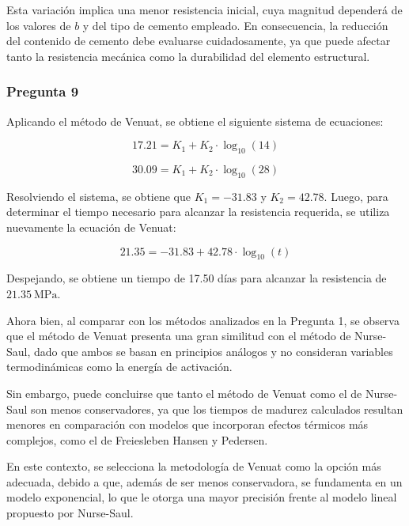 Esta variación implica una menor resistencia inicial, cuya magnitud dependerá de los valores de \(b\) y del tipo de cemento empleado. En consecuencia, la reducción del contenido de cemento debe evaluarse cuidadosamente, ya que puede afectar tanto la resistencia mecánica como la durabilidad del elemento estructural.

\subsubsection*{Pregunta 9} 

Aplicando el método de Venuat, se obtiene el siguiente sistema de ecuaciones:

\begin{equation}
    17.21 = K_1 + K_2 \cdot \log_{10}(14)
\end{equation}

\begin{equation}
    30.09 = K_1 + K_2 \cdot \log_{10}(28)
\end{equation}

Resolviendo el sistema, se obtiene que \( K_1 = -31.83 \) y \( K_2 = 42.78 \).  
Luego, para determinar el tiempo necesario para alcanzar la resistencia requerida, se utiliza nuevamente la ecuación de Venuat:

\begin{equation}
    21.35 = -31.83 + 42.78 \cdot \log_{10}(t)
\end{equation}

Despejando, se obtiene un tiempo de 17.50 días para alcanzar la resistencia de \(21.35~\mathrm{MPa}\).


Ahora bien, al comparar con los métodos analizados en la Pregunta 1, se observa que el método de Venuat presenta una gran similitud con el método de Nurse-Saul, dado que ambos se basan en principios análogos y no consideran variables termodinámicas como la energía de activación.  

Sin embargo, puede concluirse que tanto el método de Venuat como el de Nurse-Saul son menos conservadores, ya que los tiempos de madurez calculados resultan menores en comparación con modelos que incorporan efectos térmicos más complejos, como el de Freiesleben Hansen y Pedersen.

En este contexto, se selecciona la metodología de Venuat como la opción más adecuada, debido a que, además de ser menos conservadora, se fundamenta en un modelo exponencial, lo que le otorga una mayor precisión frente al modelo lineal propuesto por Nurse-Saul.



